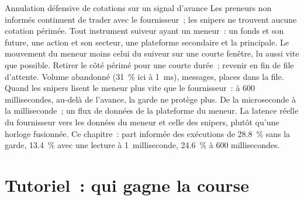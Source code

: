 \begin{strategyfile}{Annulation défensive de cotations sur un signal d'avance}\label{strat:hf:latency-arbitrage-and-its-defence:guard}
 Les preneurs non informés continuent de trader avec le fournisseur~; les snipers ne trouvent aucune cotation périmée.
 Tout instrument suiveur ayant un meneur~: un fonds et son future, une action et son secteur, une plateforme secondaire et la
principale.
 Le mouvement du meneur moins celui du suiveur sur une courte fenêtre, lu aussi vite que possible.
 Retirer le côté périmé pour une courte durée~; revenir en fin de file d'attente.
 Volume abandonné (31~\% ici à 1~ms), messages, places dans la file.
 Quand les snipers lisent le meneur plus vite que le fournisseur~: à 600 millisecondes, au-delà de l'avance, la garde ne protège plus.
 De la microseconde à la milliseconde~; un flux de données de la plateforme du meneur.
 La latence réelle du fournisseur vers les données du meneur et celle des snipers, plutôt qu'une horloge fusionnée.
 Ce chapitre~: part informée des exécutions de 28.8~\% sans la garde, 13.4~\% avec une lecture à 1~milliseconde, 24.6~\% à 600 millisecondes.
\end{strategyfile}

\section{Tutoriel~: qui gagne la course}\label{tut:hf:latency-arbitrage-and-its-defence:tut}

